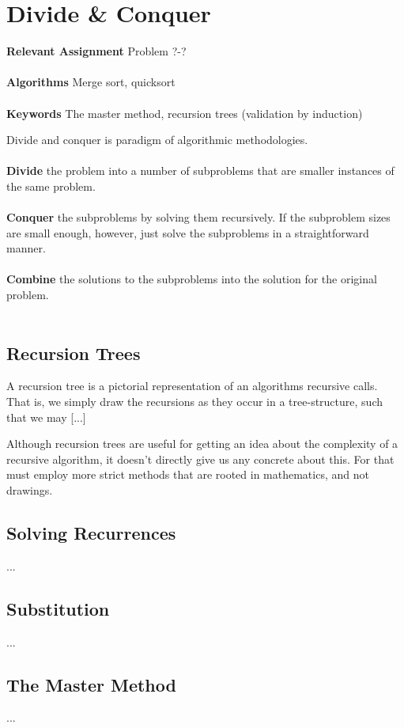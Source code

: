 
\chapter{Divide \& Conquer}
\label{ch:divideandconquer}

\textbf{Relevant Assignment} Problem ?-?\\\\
\textbf{Algorithms} Merge sort, quicksort\\\\
\textbf{Keywords} The master method, recursion trees (validation by induction)
\vspace{1in}

\noindent Divide and conquer is paradigm of algorithmic methodologies.
\\\\
\noindent \textbf{Divide} the problem into a number of subproblems that are
smaller instances of the same problem.
\\\\
\noindent \textbf{Conquer} the subproblems by solving them recursively. If the
subproblem sizes are small enough, however, just solve the subproblems in a
straightforward manner.
\\\\
\noindent \textbf{Combine} the solutions to the subproblems into the solution
for the original problem.
\\\\

\section{Recursion Trees}
A recursion tree is a pictorial representation of an algorithms recursive
calls. That is, we simply draw the recursions as they occur in a
tree-structure, such that we may [...]

Although recursion trees are useful for getting an idea about the complexity
of a recursive algorithm, it doesn't directly give us any concrete about this.
For that must employ more strict methods that are rooted in mathematics, and
not drawings.

\section{Solving Recurrences}
...

\section{Substitution}
...

\section{The Master Method}
...

